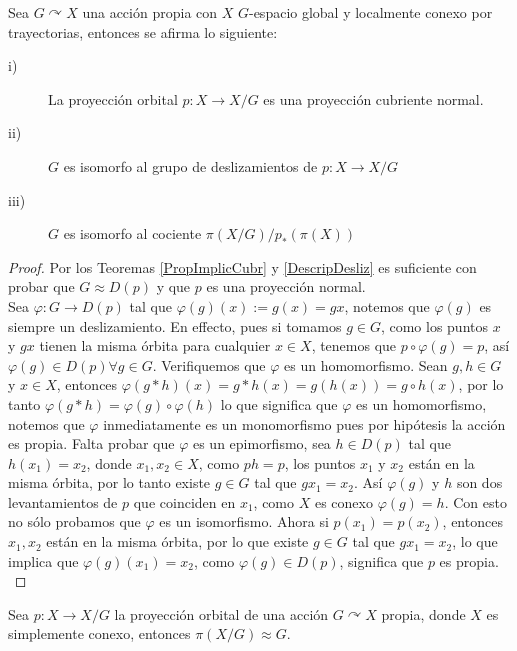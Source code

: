 \begin{theorem}
Sea $G \curvearrowright X$ una acci\'on propia con $X$ $G$-espacio global y localmente conexo por trayectorias, entonces se afirma lo siguiente:

\begin{description}
\item[i)]La proyecci\'on orbital $p:X \rightarrow X/G$ es una proyecci\'on cubriente normal.

\item[ii)]$G$ es isomorfo al grupo de deslizamientos de $p:X \rightarrow X/G$

\item[iii)]$G$ es isomorfo al cociente $\pi(X/G)/p_*(\pi(X))$
\end{description}
\end{theorem}

\begin{proof}
Por los Teoremas \ref{PropImplicCubr} y \ref{DescripDesliz} es suficiente con probar que $G \approx D(p)$ y que $p$ es una proyecci\'on normal.\\
Sea $\varphi:G \rightarrow D(p)$ tal que $\varphi (g)(x):=g(x)=gx$, notemos que $\varphi(g)$ es siempre un deslizamiento. En effecto, pues si tomamos $g \in G$, como los puntos $x$ y $gx$ tienen la misma \'orbita para cualquier $x\in X$, tenemos que $p \circ \varphi(g) = p$, as\'i $\varphi (g) \in D(p) \forall g \in G$. Verifiquemos que $\varphi$ es un homomorfismo. Sean $g,h \in G$ y $x \in X$, entonces $\varphi(g*h)(x)=g*h(x)=g(h(x))=g \circ h (x)$, por lo tanto $\varphi(g*h)=\varphi(g)\circ \varphi(h)$ lo que significa que $\varphi$ es un homomorfismo, notemos que $\varphi$ inmediatamente es un monomorfismo pues por hip\'otesis la acci\'on  es propia. Falta probar que $\varphi$ es un epimorfismo, sea $h \in D(p)$ tal que $h(x_1)=x_2$, donde $x_1,x_2 \in X$, como $ph=p$, los puntos $x_1$ y $x_2$ est\'an en la misma \'orbita, por lo tanto existe $g \in G$ tal que $gx_1=x_2$. As\'i $\varphi(g)$ y $h$ son dos levantamientos de $p$ que coinciden en $x_1$, como $X$ es conexo $\varphi(g)=h$. Con esto no s\'olo probamos que $\varphi$ es un isomorfismo. Ahora si $p(x_1)=p(x_2)$, entonces $x_1,x_2$ est\'an en la misma \'orbita, por lo que existe $g \in G$ tal que $gx_1=x_2$, lo que implica que $\varphi(g)(x_1)=x_2$, como $\varphi(g) \in D(p)$, significa que $p$ es propia.\\
\end{proof}

\begin{corollary}
Sea $p:X \rightarrow X/G$ la proyecci\'on orbital de una acci\'on $G \curvearrowright X$ propia, donde $X$ es simplemente conexo, entonces $\pi(X/G) \approx G$.\\
\end{corollary}

